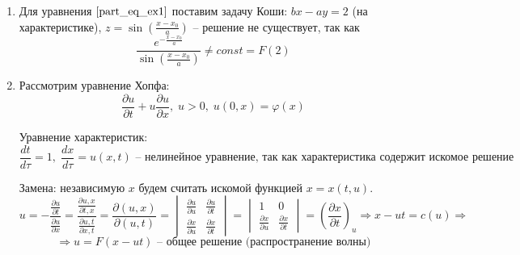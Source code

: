 \begin{enumerate}
    \item

    Для уравнения $\eqref{part_eq_ex1}$ поставим задачу Коши: $bx - ay = 2$ (на характеристике), $z = \sin (\frac{x - x_0}{a})$ -- решение не существует, так как 
    \begin{equation*}
        \frac{e^{-\frac{x - x_0}{a}}}{\sin \left( \frac{x - x_0}{a} \right)} \neq const = F(2)
    \end{equation*}

    \item Рассмотрим уравнение Хопфа:
    \begin{equation*}
        \frac{\partial u}{\partial t} + u \frac{\partial u}{\partial x}, \; u > 0, \; u(0, x) = \varphi(x)
    \end{equation*}

    Уравнение характеристик:
    \begin{equation*}
        \frac{dt}{d \tau} = 1, \; \frac{dx}{d \tau} = u(x, t) \text{ -- нелинейное уравнение, так как характеристика содержит искомое решение}
    \end{equation*}

    Замена: независимую $x$ будем считать искомой функцией $x = x(t, u)$.
    \begin{equation*}
        u = - \frac{\frac{\partial u}{\partial t}}{\frac{\partial u}{\partial x}}  = \frac{\frac{\partial u, x}{\partial t, x}}{\frac{\partial u, t}{\partial x, t}} = \frac{\partial (u, x)}{\partial (u, t)} = 
        \begin{vmatrix}
            \frac{\partial u}{\partial u} & \frac{\partial u}{\partial t} \\
            \frac{\partial x}{\partial u} & \frac{\partial x}{\partial t}
        \end{vmatrix} = 
        \begin{vmatrix}
            1 & 0 \\
            \frac{\partial x}{\partial u} & \frac{\partial x}{\partial t}
        \end{vmatrix} = \left( \frac{\partial x}{\partial t} \right)_{u} \Rightarrow x - ut = c(u) \Rightarrow 
    \end{equation*}
    \begin{equation*}
        \Rightarrow u = F(x - ut) \text{ -- общее решение (распространение волны)}
    \end{equation*}

\end{enumerate}
